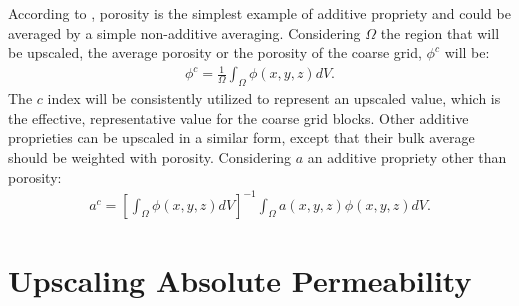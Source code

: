 According to \cite{Lie2015}, porosity is the simplest example of additive propriety and could be averaged by a simple non-additive averaging. 
%
Considering $\Omega$ the region that will be upscaled, the average porosity or the porosity of the coarse grid, $\phi^{c}$ will be:
%
%
\begin{align}
	\label{equation-upscaling-porosity}
	\phi^{c}=\frac{1}{\Omega}\int_{\Omega}\phi(x,y,z)dV.
\end{align}
\noindent
%
The $c$ index will be consistently utilized to represent an upscaled value, which is the effective, representative value for the coarse grid blocks. 
%
Other additive proprieties can be upscaled in a similar form, except that their bulk average should be weighted with porosity. 
%
Considering $a$ an additive propriety other than porosity:
%
\begin{align}
	\label{equation-upscaling-additive-proprieties}
	a^c=\left[\int_{\Omega}\phi(x,y,z)dV\right]^{-1}\int_{\Omega}a(x,y,z)\phi(x,y,z)dV.
\end{align}

\section{Upscaling Absolute Permeability}

